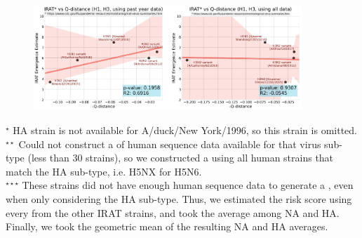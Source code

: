 \ifFIGS
\begin{figure}[!t]
  \centering    
  \tikzexternalenable  
  \iftikzX 
  \vspace{-5pt}    
  
  \includegraphics[width=0.9\textwidth]{Figures/External/IRAT_split.png}
  \fi

  \label{irat}
\end{figure}
\else
{}\label{irat}
\fi






\begin{table}[!ht]\centering
{}\label{irattab}

\sffamily\fontsize{7}{8}\selectfont


\flushleft

\fontsize{8}{8}\selectfont
$^\star$ HA strain is not available for A/duck/New York/1996, so this strain is omitted.\\
$^{\star\star}$ Could not construct a \qnet of human sequence data available for that virus sub-type (less than 30 strains), so we constructed a \qnet using all human strains that match the HA sub-type, i.e. H5NX for H5N6.\\
$^{\star\star\star}$ These strains did not have enough human sequence data to generate a \qnet, even when only considering the HA sub-type. Thus, we estimated the risk score using every \qnet from the other IRAT strains, and took the average among NA and HA. Finally, we took the geometric mean of the resulting NA and HA averages.
\end{table}

